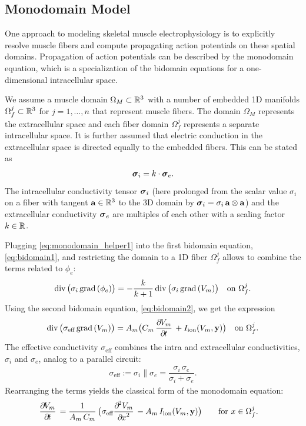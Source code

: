 \subsection{Monodomain Model}\label{sec:monodomain_model}
One approach to modeling skeletal muscle electrophysiology is to explicitly resolve muscle fibers and compute propagating action potentials on these spatial domains.
Propagation of action potentials can be described by the monodomain equation, which is a specialization of the bidomain equations for a one-dimensional intracellular space.

We assume a muscle domain $\Omega_M \subset \mathbb{R}^3$ with a number of embedded 1D manifolds $\Omega_f^j\subset \mathbb{R}^3$ for $j=1,\dots,n$ that represent muscle fibers. The domain $\Omega_M$ represents the extracellular space and each fiber domain $\Omega_f^j$ represents a separate  intracellular space.
It is further assumed that electric conduction in the extracellular space is directed equally to the embedded fibers. This can be stated as%
\begin{align}\label{eq:monodomain_helper1}
  \boldsymbol{\sigma}_i = k\cdot \boldsymbol{\sigma}_e.  
\end{align}
%
The intracellular conductivity tensor $\boldsymbol{\sigma}_i$ (here prolonged from the scalar value $\sigma_i$ on a fiber with tangent $\textbf{a} \in \mathbb{R}^3$ to the 3D domain by $\boldsymbol{\sigma}_i = \sigma_i \, \textbf{a} \otimes \textbf{a}$) and the extracellular conductivity $\boldsymbol{\sigma}_e$ are multiples of each other with a scaling factor $k\in\mathbb{R}$.

Plugging \cref{eq:monodomain_helper1} into the first bidomain equation, \cref{eq:bidomain1}, and restricting the domain to a 1D fiber $\Omega_f^j$ allows to combine the terms related to $\phi_e$:
%
\begin{align*}
  \hbox{div} \,\big(\sigma_i\,\hbox{grad} \,(\phi_e)\big) = -\displaystyle\frac{\displaystyle{k}}{\displaystyle{k+1}}\, \hbox{div} \,\big(\sigma_i\,\hbox{grad} \,(V_m)\big) \quad \text{on }\Omega_f^j.
\end{align*}
% 
Using the second bidomain equation, \cref{eq:bidomain2}, we get the expression
%
\begin{align*}
  \div\big(\sigma_\text{eff} \,\grad(V_m)\big) = A_m\big(C_m\,\p{V_m}{t} + I_\text{ion}(V_m,\bfy)\big) \quad \text{on }\Omega_f^j.
\end{align*}
%
The effective conductivity $\sigma_\text{eff}$ combines the intra and extracellular conductivities, $\sigma_i$ and $\sigma_e$, analog to a parallel circuit:
\begin{align*}
  \sigma_\text{eff} := \sigma_i \parallel \sigma_e = \dfrac{\sigma_i\,\sigma_e}{\sigma_i + \sigma_e}.
\end{align*}
%
Rearranging the terms yields the classical form of the monodomain equation:
%
\begin{align} %
  &\dfrac{\partial V_m}{\partial t} = \dfrac{1}{A_m\,C_m}\big(\sigma_\text{eff}\dfrac{\partial^2 V_m}{\partial x^2} - A_m\,I_\text{ion}(V_m,\bfy)\big) \quad && \text{for }x \in \Omega_f^j. \label{eq:monodomain}
\end{align}
%

